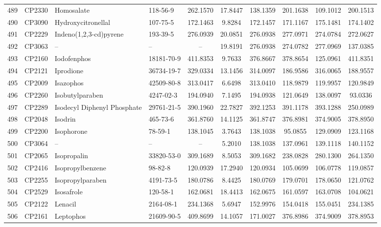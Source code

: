 \begin{longtable}{clllcccccc}
489 & CP2330 & Homosalate & 118-56-9 & 262.1570 & 17.8447 & 138.1359 & 201.1638 & 109.1012 & 200.1513 \\ 
490 & CP3090 & Hydroxycitronellal & 107-75-5 & 172.1463 & 9.8284 & 172.1457 & 171.1167 & 175.1481 & 174.1402 \\ 
491 & CP2229 & Indeno(1,2,3-cd)pyrene & 193-39-5 & 276.0939 & 20.0851 & 276.0938 & 277.0971 & 274.0784 & 272.0627 \\ 
492 & CP3063 & – & – & – & 19.8191 & 276.0938 & 274.0782 & 277.0969 & 137.0385 \\ 
493 & CP2160 & Iodofenphos & 18181-70-9 & 411.8353 & 9.7633 & 376.8667 & 378.8654 & 125.0961 & 411.8351 \\ 
494 & CP2121 & Iprodione & 36734-19-7 & 329.0334 & 13.1456 & 314.0097 & 186.9586 & 316.0065 & 188.9557 \\ 
495 & CP2009 & Isazophos & 42509-80-8 & 313.0417 & 6.6498 & 313.0410 & 118.9879 & 119.9957 & 120.9849 \\ 
496 & CP2260 & Isobutylparaben & 4247-02-3 & 194.0940 & 7.1495 & 194.0938 & 121.0649 & 138.0097 & 93.0336 \\ 
497 & CP2289 & Isodecyl Diphenyl Phosphate & 29761-21-5 & 390.1960 & 22.7827 & 392.1253 & 391.1178 & 393.1288 & 250.0989 \\ 
498 & CP2048 & Isodrin & 465-73-6 & 361.8760 & 14.1125 & 361.8747 & 376.8981 & 374.9005 & 378.8950 \\ 
499 & CP2200 & Isophorone & 78-59-1 & 138.1045 & 3.7643 & 138.1038 & 95.0855 & 129.0909 & 123.1168 \\ 
500 & CP3064 & – & – & – & 5.2010 & 138.1038 & 137.0961 & 139.1118 & 140.1152 \\ 
501 & CP2065 & Isopropalin & 33820-53-0 & 309.1689 & 8.5053 & 309.1682 & 238.0828 & 280.1300 & 264.1350 \\ 
502 & CP2416 & Isopropylbenzene & 98-82-8 & 120.0939 & 17.2940 & 120.0934 & 105.0699 & 106.0778 & 119.0857 \\ 
503 & CP2255 & Isopropylparaben & 4191-73-5 & 180.0786 & 8.4425 & 180.0769 & 179.0701 & 178.0650 & 121.0762 \\ 
504 & CP2529 & Isosafrole & 120-58-1 & 162.0681 & 18.4413 & 162.0675 & 161.0597 & 163.0708 & 104.0621 \\ 
505 & CP2122 & Lenacil & 2164-08-1 & 234.1368 & 5.6947 & 152.9976 & 154.0418 & 155.0451 & 234.1385 \\ 
506 & CP2161 & Leptophos & 21609-90-5 & 409.8699 & 14.1057 & 171.0027 & 376.8986 & 374.9009 & 378.8953 \\ 

\end{longtable}
